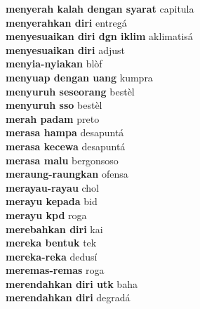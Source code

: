\textbf{ menyerah kalah dengan syarat  } capitula \\
\textbf{ menyerahkan diri  } entregá \\
\textbf{ menyesuaikan diri dgn iklim  } aklimatisá \\
\textbf{ menyesuaikan diri  } adjust \\
\textbf{ menyia-nyiakan  } blòf \\
\textbf{ menyuap dengan uang  } kumpra \\
\textbf{ menyuruh seseorang  } bestèl \\
\textbf{ menyuruh sso  } bestèl \\
\textbf{ merah padam  } preto \\
\textbf{ merasa hampa  } desapuntá \\
\textbf{ merasa kecewa  } desapuntá \\
\textbf{ merasa malu  } bergonsoso \\
\textbf{ meraung-raungkan  } ofensa \\
\textbf{ merayau-rayau  } chol \\
\textbf{ merayu kepada  } bid \\
\textbf{ merayu kpd  } roga \\
\textbf{ merebahkan diri  } kai \\
\textbf{ mereka bentuk  } tek \\
\textbf{ mereka-reka  } dedusí \\
\textbf{ meremas-remas  } roga \\
\textbf{ merendahkan diri utk  } baha \\
\textbf{ merendahkan diri  } degradá \\
